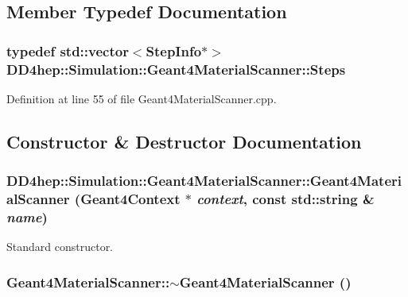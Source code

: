 \subsection{Member Typedef Documentation}
\hypertarget{class_d_d4hep_1_1_simulation_1_1_geant4_material_scanner_af5f8938342c8e56e7db11a372b8d4d9c}{
\subsubsection[{Steps}]{\setlength{\rightskip}{0pt plus 5cm}typedef std::vector$<${\bf StepInfo}$\ast$$>$ {\bf DD4hep::Simulation::Geant4MaterialScanner::Steps}}}
\label{class_d_d4hep_1_1_simulation_1_1_geant4_material_scanner_af5f8938342c8e56e7db11a372b8d4d9c}


Definition at line 55 of file Geant4MaterialScanner.cpp.

\subsection{Constructor \& Destructor Documentation}
\hypertarget{class_d_d4hep_1_1_simulation_1_1_geant4_material_scanner_ab91cbd7d8fe29498eacee9be0f95b6d1}{
\subsubsection[{Geant4MaterialScanner}]{\setlength{\rightskip}{0pt plus 5cm}DD4hep::Simulation::Geant4MaterialScanner::Geant4MaterialScanner ({\bf Geant4Context} $\ast$ {\em context}, \/  const std::string \& {\em name})}}
\label{class_d_d4hep_1_1_simulation_1_1_geant4_material_scanner_ab91cbd7d8fe29498eacee9be0f95b6d1}


Standard constructor. \hypertarget{class_d_d4hep_1_1_simulation_1_1_geant4_material_scanner_af31f21a00b4c9cab1a73aeddb1a3773b}{
\subsubsection[{$\sim$Geant4MaterialScanner}]{\setlength{\rightskip}{0pt plus 5cm}Geant4MaterialScanner::$\sim$Geant4MaterialScanner ()}}
\label{class_d_d4hep_1_1_simulation_1_1_geant4_material_scanner_af31f21a00b4c9cab1a73aeddb1a3773b}



